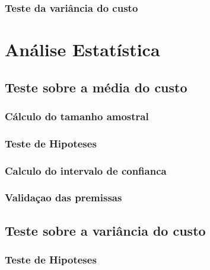 \documentclass[]{article}
\begin{document}
\hypertarget{teste-da-variancia-do-custo}{%
\subsubsection{Teste da variância do
custo}\label{teste-da-variancia-do-custo}}

\hypertarget{analise-estatistica}{%
\section{Análise Estatística}\label{analise-estatistica}}

\hypertarget{teste-sobre-a-media-do-custo}{%
\subsection{Teste sobre a média do
custo}\label{teste-sobre-a-media-do-custo}}

\hypertarget{calculo-do-tamanho-amostral}{%
\subsubsection{Cálculo do tamanho
amostral}\label{calculo-do-tamanho-amostral}}

\hypertarget{teste-de-hipoteses}{%
\subsubsection{Teste de Hipoteses}\label{teste-de-hipoteses}}

\hypertarget{calculo-do-intervalo-de-confianca}{%
\subsubsection{Calculo do intervalo de
confianca}\label{calculo-do-intervalo-de-confianca}}

\hypertarget{validacao-das-premissas-1}{%
\subsubsection{Validaçao das
premissas}\label{validacao-das-premissas-1}}

\hypertarget{teste-sobre-a-variancia-do-custo}{%
\subsection{Teste sobre a variância do
custo}\label{teste-sobre-a-variancia-do-custo}}

\hypertarget{teste-de-hipoteses-1}{%
\subsubsection{Teste de Hipoteses}\label{teste-de-hipoteses-1}}
\end{document}
